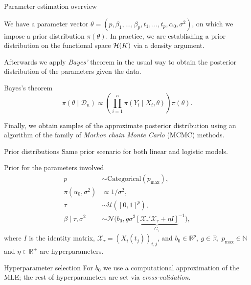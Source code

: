 \documentclass[10pt, english, professionalfonts]{beamer}
\newcommand{\N}{\mathbb{N}}
\newcommand{\R}{\mathbb{R}}
\newcommand{\Hcal}{\ensuremath\mathcal{H}}
\begin{document}
\begin{frame}{Parameter estimation overview}

  We have a parameter vector \(\theta = (p, \beta_1,\dots, \beta_p, t_1,\dots, t_p, \alpha_0, \sigma^2)\), on which we impose a prior distribution \(\pi(\theta)\). In practice, we are establishing a prior distribution on the functional space \(\Hcal(K)\) via a density argument.

  \vspace{1em}

  Afterwards we apply \textit{Bayes'} theorem in the usual way to obtain the posterior distribution of the parameters given the data.

  \begin{block}{Bayes's theorem}
      \[
      \pi(\theta \mid \mathcal D_n) \propto \left( \prod_{i=1}^n \pi(Y_i\mid X_i, \theta) \right)\pi(\theta).
      \]
  \end{block}
  \vspace{1em}

  Finally, we obtain samples of the approximate posterior distribution using an algorithm of the family of \textit{Markov chain Monte Carlo} (MCMC) methods.

\end{frame}

\begin{frame}{Prior distributions}
  Same prior scenario for both linear and logistic models.
  \begin{block}{Prior for the parameters involved}
    \vspace{-1em}
  \begin{align*}
    p &\sim \text{Categorical}(p_{\text{max}}),\\
  \pi(\alpha_0, \sigma^2)              & \propto 1/\sigma^2,                                                     \\
  \tau                     & \sim \mathcal U([0, 1]^p),                                              \\
  \beta\mid \tau, \sigma^2 & \sim \mathcal N\big(b_0, g\sigma^2{\underbrace{\left[\mathcal X_\tau' \mathcal X_\tau + \eta I\right]}_{G_\tau}}^{-1}\big),
\end{align*}
where \(I\) is the identity matrix, \(\mathcal X_\tau = (X_i(t_j))_{i,j}\), and \(b_0\in \R^p, \ g \in \R, \ p_{\text{max}}\in \N\) and \(\eta \in \R^+\) are hyperparameters.
\end{block}


\begin{alertblock}{Hyperparameter selection}
  \vspace{0.1em}
  For \(b_0\) we use a computational approximation of the MLE; the rest of hyperparameters are set via \textit{cross-validation}.
\end{alertblock}
\end{frame}
\end{document}
